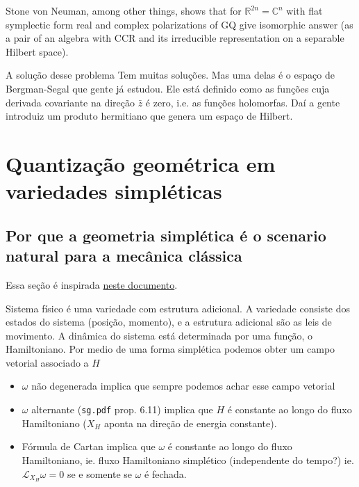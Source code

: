 \begin{remark}[Sergey]\leavevmode
Stone von Neuman, among other things, shows that for $\mathbb{R}^{2n} = \mathbb{C}^n$ with flat symplectic form real and complex polarizations of GQ give isomorphic answer (as a pair of an algebra with CCR and its irreducible representation on a separable Hilbert space).
\end{remark}

\begin{thing3}{A solução desse problema}\leavevmode
	Tem muitas soluções. Mas uma delas é o espaço de Bergman-Segal que gente já estudou. Ele está definido como as funções cuja derivada covariante na direção $\bar{z}$ é zero, i.e. as funções holomorfas. Daí a gente introduiz um produto hermitiano que genera um espaço de Hilbert.
\end{thing3}

\section{Quantização geométrica em variedades simpléticas}

\subsection{Por que a geometria simplética é o scenario natural para a mecânica clássica}

Essa seção é inspirada \href{https://cohn.mit.edu/symplectic/}{neste documento}.

Sistema f\'isico \'e uma variedade com estrutura adicional. A variedade consiste dos estados do sistema (posi\c c\~ao, momento), e a estrutura adicional s\~ao as leis de movimento. A din\^amica do sistema est\'a determinada por uma fun\c c\~ao, o Hamiltoniano. Por medio de uma forma simpl\'etica podemos obter um campo vetorial associado a $H$ 

\begin{itemize}
\item $\omega$ n\~ao degenerada implica que sempre podemos achar esse campo vetorial

\item  $\omega$ alternante (\texttt{sg.pdf} prop. 6.11) implica que $H$ \'e constante ao longo do fluxo Hamiltoniano ($X_H$ aponta na  dire\c c\~ao de energia constante).

\item F\'ormula de Cartan implica que $\omega$  \'e constante ao longo do fluxo Hamiltoniano, ie. fluxo Hamiltoniano simpl\'etico (independente do tempo?) ie. $\mathcal{L}_{X_H}\omega=0$ se e somente se $\omega$ \'e fechada.
\end{itemize}

